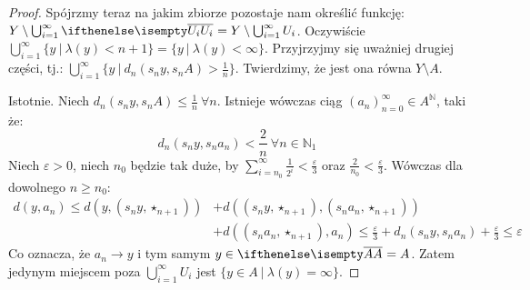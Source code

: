 \begin{thm}
\begin{proof}
  Spójrzmy teraz na jakim zbiorze pozostaje nam określić funkcję: $Y \setminus \bigcup_{i=1}^\infty \cl{U_i} = Y \setminus \bigcup_{i=1}^\infty U_i$. Oczywiście $\bigcup_{i=1}^\infty \{y\ |\ \lambda(y) < n+1\} = \{y\ |\ \lambda(y) < \infty\}$. Przyjrzyjmy się uważniej drugiej części, tj.: $\bigcup_{i=1}^\infty \{y\ |\ d_n(s_n y, s_n A) > \frac{1}{n}\}$. Twierdzimy, że jest ona równa $Y \setminus A$.
  
  Istotnie. Niech $d_n(s_n y, s_n A) \leq \frac{1}{n}\ \forall n$. Istnieje wówczas ciąg $(a_n)_{n=0}^\infty \in A^\mathbb{N}$, taki że:
  \[
    d_n(s_n y, s_n a_n) < \frac{2}{n}\ \forall n \in \mathbb{N}_1
  \]
  Niech $\varepsilon > 0$, niech $n_0$ będzie tak duże, by $\sum_{i=n_0}^\infty \frac{1}{2^i}< \frac{\varepsilon}{3}$ oraz $\frac{2}{n_0} < \frac{\varepsilon}{3}$. Wówczas dla dowolnego $n \geq n_0$:
  \begin{align*}
    d(y, a_n) \leq
    d(y, (s_n y, \star_{n+1})) &+ d((s_n y, \star_{n+1}), (s_n a_n, \star_{n+1})) \\
    &+ d((s_n a_n, \star_{n+1}), a_n) \leq \frac{\varepsilon}{3} + d_n(s_n y, s_n a_n) + \frac{\varepsilon}{3} \leq \varepsilon
  \end{align*}
  Co oznacza, że $a_n \rightarrow y$ i tym samym $y \in \cl{A} = A$. Zatem jedynym miejscem poza $\bigcup_{i=1}^\infty U_i$ jest $\{y \in A\ |\ \lambda(y) = \infty\}$.
  

\end{proof}
\end{thm}
